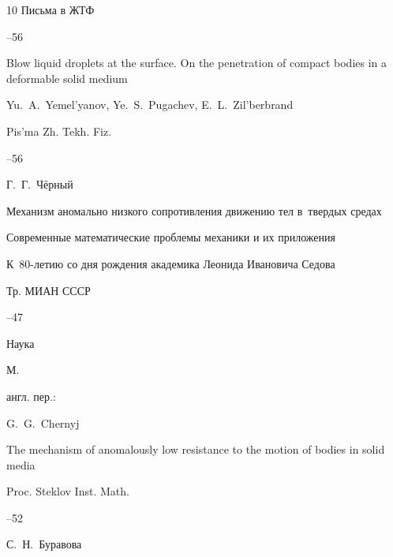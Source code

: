 \begin{thebibliography}{10}
\jour  Письма в ЖТФ




--56

\misctransl

\paper Blow liquid droplets at the surface. On the penetration of compact bodies in a deformable solid medium

\by Yu.~A.~Yemel'yanov, Ye.~S.~Pugachev, E.~L.~Zil'berbrand

\jour Pis'ma Zh. Tekh. Fiz.




--56



\pagebreak




\by Г.~Г.~Чёрный

\paper Механизм аномально низкого сопротивления движению тел в~твердых средах

\inbook Современные математические проблемы механики и их приложения

\bookinfo К~80-летию со дня рождения академика Леонида Ивановича Седова

\serial Тр. МИАН СССР



--47

\publ Наука

\publaddr М.



\transl англ. пер.:~

\by G.~G.~Chernyj

\paper The mechanism of anomalously low resistance to the motion of bodies in solid media

\jour Proc. Steklov Inst. Math. 


--52 






\by С.~Н.~Буравова


\end{thebibliography}
